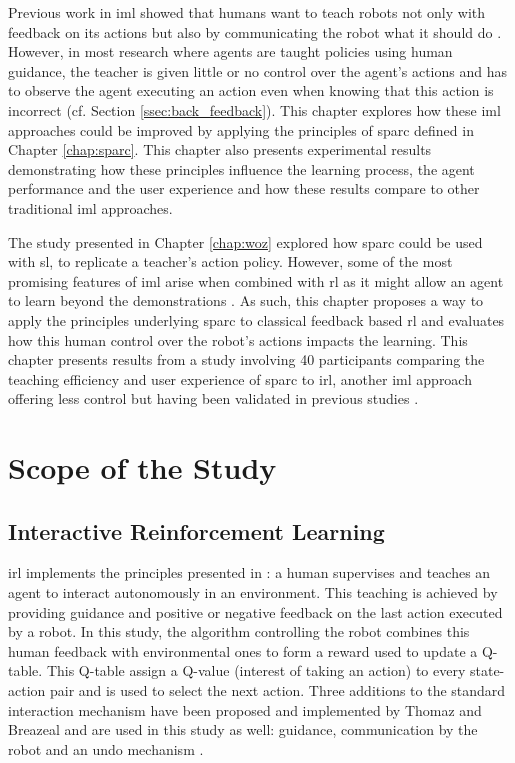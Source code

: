 Previous work in \gls{iml} showed that humans want to teach robots not only with feedback on its actions but also by communicating the robot what it should do \citep{thomaz2008teachable}. However, in most research where agents are taught policies using human guidance, the teacher is given little or no control over the agent's actions and has to observe the agent executing an action even when knowing that this action is incorrect (cf. Section \ref{ssec:back_feedback}). This chapter explores how these \gls{iml} approaches could be improved by applying the principles of \gls{sparc} defined in Chapter \ref{chap:sparc}. This chapter also presents experimental results demonstrating how these principles influence the learning process, the agent performance and the user experience and how these results compare to other traditional \gls{iml} approaches.

The study presented in Chapter \ref{chap:woz} explored how \gls{sparc} could be used with \acrlong{sl}, to replicate a teacher's action policy. However, some of the most promising features of \gls{iml} arise when combined with \gls{rl} as it might allow an agent to learn beyond the demonstrations \citep{abbeel2004apprenticeship}. As such, this chapter proposes a way to apply the principles underlying \gls{sparc} to classical feedback based \gls{rl} and evaluates how this human control over the robot's actions impacts the learning. This chapter presents results from a study involving 40 participants comparing the teaching efficiency and user experience of \gls{sparc} 
to \gls{irl}, another \gls{iml} approach offering less control but having been validated in previous studies \citep{thomaz2008teachable}. %

\section{Scope of the Study}

\subsection{Interactive Reinforcement Learning}

\gls{irl} implements the principles presented in \cite{thomaz2008teachable}: a human supervises and teaches an agent to interact autonomously in an environment. This teaching is achieved by providing guidance and positive or negative feedback on the last action executed by a robot. In this study, the algorithm controlling the robot combines this human feedback with environmental ones to form a reward used to update a Q-table. This Q-table assign a Q-value (interest of taking an action) to every state-action pair and is used to select the next action. Three additions to the standard interaction mechanism have been proposed and implemented by Thomaz and Breazeal and are used in this study as well: guidance, communication by the robot and an undo mechanism \citep{thomaz2008teachable}. 

